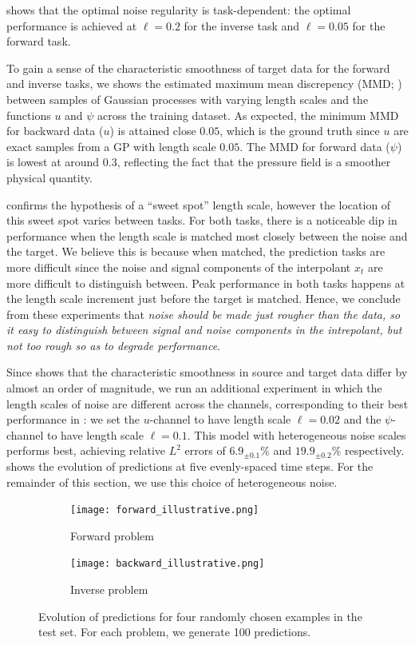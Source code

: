 shows that the optimal noise regularity is task-dependent: the optimal performance is achieved at  \(\ell = 0.2\) for the inverse task and \(\ell = 0.05\) for the forward task.

To gain a sense of the characteristic smoothness of target data for the forward and inverse tasks, we  shows the estimated maximum mean discrepency (MMD; \citealp{gretton2012kernel}) between samples of Gaussian processes with varying length scales and the functions \(u\) and \(\psi\) across the training dataset. As expected, the minimum MMD for backward data (\(u\)) is attained close  \(0.05\), which is the ground truth since \(u\) are exact samples from a GP with length scale \(0.05\). The MMD for forward data (\(\psi\)) is lowest at around \(0.3\), reflecting the fact that the pressure field is a smoother physical quantity.

 confirms the hypothesis of a ``sweet spot'' length scale, however the location of this sweet spot varies between tasks. For both tasks, there is a noticeable dip in performance when the length scale is matched most closely between the noise and the target. We believe this is because when matched, the prediction tasks are more difficult since the noise and signal components of the interpolant \(x_{t}\) are more difficult to distinguish between. Peak performance in both tasks happens at the length scale increment just before the target is matched. Hence, we conclude from these experiments that \textit{noise should be made just rougher than the data, so it easy to distinguish between signal and noise components in the intrepolant, but not too rough so as to degrade performance}.

Since  shows that the characteristic smoothness in source and target data differ by almost an order of magnitude, we run an additional experiment in which the length scales of noise are different across the channels, corresponding to their best performance in : we set the \(u\)-channel to have length scale \(\ell=0.02\) and the \(\psi\)-channel to have length scale \(\ell=0.1\). This model with heterogeneous noise scales performs best, achieving relative \(L^{2}\) errors of \(6.9_{\pm 0.1}\%\) and \(19.9_{\pm0.2}\%\) respectively.  shows the evolution of predictions at five evenly-spaced time steps. For the remainder of this section, we use this choice of heterogeneous noise.

\begin{figure}[tbhp]
\begin{subfigure}[t]{0.49\linewidth}
  \texttt{[image: forward\_illustrative.png]}
  \caption{Forward problem}
\end{subfigure}\hfill
\begin{subfigure}[t]{0.49\linewidth}
  \texttt{[image: backward\_illustrative.png]}
  \caption{Inverse problem}
\end{subfigure}
\caption{Evolution of predictions for four randomly chosen examples in the test set. For each problem, we generate 100 predictions. } \label{fig:evolution}
\end{figure}

